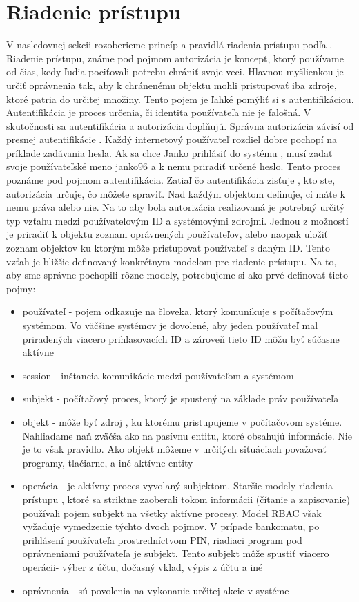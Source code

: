 \section{Riadenie prístupu}
V nasledovnej sekcii rozoberieme princíp a pravidlá riadenia prístupu podľa \cite{kuhn}. Riadenie prístupu, známe pod pojmom autorizácia je koncept, ktorý používame od čias, kedy ľudia pociťovali potrebu chrániť svoje veci. Hlavnou myšlienkou je určiť oprávnenia tak, aby k chránenému objektu mohli pristupovať iba zdroje, ktoré patria do určitej množiny. Tento pojem je ľahké pomýliť si s autentifikáciou. Autentifikácia je  proces určenia, či identita používateľa nie je falošná. V skutočnosti sa autentifikácia a autorizácia doplňujú. Správna autorizácia závisí od presnej autentifikácie . Každý internetový používateľ  rozdiel dobre pochopí na príklade zadávania hesla. Ak sa chce Janko prihlásiť do systému , musí zadať svoje používateľské meno janko96 a k nemu priradiť určené heslo. Tento proces poznáme pod pojmom autentifikácia.  Zatiaľ čo autentifikácia zisťuje , kto ste, autorizácia určuje, čo môžete spraviť. Nad každým objektom definuje, ci máte k nemu práva alebo nie. Na to aby bola autorizácia realizovaná je potrebný určitý typ vzťahu medzi používateľovým ID a systémovými zdrojmi. Jednou z možností je priradiť k objektu zoznam oprávnených používateľov, alebo naopak uložiť zoznam objektov ku ktorým môže pristupovať používateľ s daným ID. Tento vzťah je bližšie definovaný konkrétnym modelom pre riadenie prístupu. Na to, aby sme správne pochopili rôzne modely, potrebujeme si ako prvé definovať tieto pojmy:
\begin{itemize}
	\item používateľ - pojem odkazuje na človeka, ktorý komunikuje s počítačovým systémom. Vo väčšine systémov je dovolené, aby jeden používateľ mal priradených viacero prihlasovacích ID a zároveň tieto ID môžu byť súčasne aktívne  
	\item session - inštancia komunikácie medzi používateľom a systémom
	\item subjekt - počítačový proces, ktorý je spustený na základe práv používateľa
	\item objekt  - môže byť zdroj , ku ktorému pristupujeme v počítačovom systéme. Nahliadame naň zväčša ako na pasívnu entitu, ktoré obsahujú informácie. Nie je to však pravidlo. Ako objekt môžeme v určitých situáciach považovať programy, tlačiarne, a iné aktívne entity
	\item operácia - je aktívny proces vyvolaný subjektom. Staršie modely riadenia prístupu , ktoré sa striktne zaoberali tokom informácii (čítanie a zapisovanie) používali pojem subjekt na všetky aktívne procesy. Model RBAC však vyžaduje vymedzenie týchto dvoch pojmov. V prípade bankomatu, po prihlásení používateľa prostredníctvom PIN, riadiaci program pod oprávneniami používateľa je subjekt. Tento subjekt môže spustiť viacero operácii- výber z účtu, dočasný vklad, výpis z účtu a iné
	\item oprávnenia - sú povolenia na vykonanie určitej akcie v systéme
\end{itemize}


